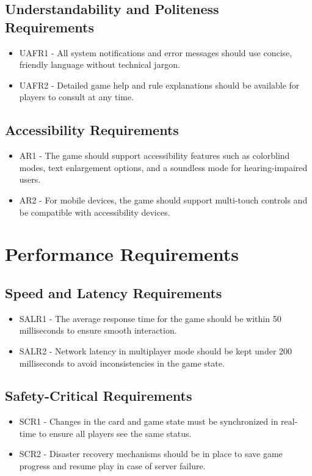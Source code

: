 \documentclass{article}
\begin{document}
\subsection{Understandability and Politeness Requirements}
\begin{itemize}
    \item UAFR1 - All system notifications and error messages should use concise, friendly language without technical jargon.
    \item UAFR2 - Detailed game help and rule explanations should be available for players to consult at any time.
\end{itemize}

\subsection{Accessibility Requirements}
\begin{itemize}
    \item AR1 - The game should support accessibility features such as colorblind modes, text enlargement options, and a soundless mode for hearing-impaired users.
    \item AR2 - For mobile devices, the game should support multi-touch controls and be compatible with accessibility devices.
\end{itemize}

\section{Performance Requirements}

\subsection{Speed and Latency Requirements}
\begin{itemize}
    \item SALR1 - The average response time for the game should be within 50 milliseconds to ensure smooth interaction.
    \item SALR2 - Network latency in multiplayer mode should be kept under 200 milliseconds to avoid inconsistencies in the game state.
\end{itemize}

\subsection{Safety-Critical Requirements}
\begin{itemize}
    \item SCR1 - Changes in the card and game state must be synchronized in real-time to ensure all players see the same status.
    \item SCR2 - Disaster recovery mechanisms should be in place to save game progress and resume play in case of server failure.
\end{itemize}
\end{document}
